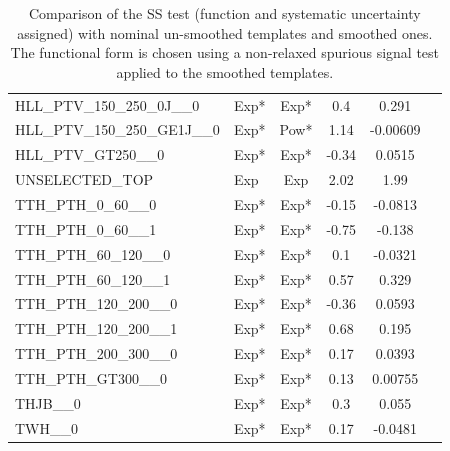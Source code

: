 \begin{table}[!h]
{\begin{tabular}{llcccc}
			HLL\_PTV\_150\_250\_0J\_\_0                                 & Exp* &Exp*&0.4&0.291\\
			HLL\_PTV\_150\_250\_GE1J\_\_0                               & Exp* &Pow*&1.14&-0.00609\\
			HLL\_PTV\_GT250\_\_0                                        & Exp* &Exp*&-0.34&0.0515\\
			UNSELECTED\_TOP                                             & Exp &Exp&2.02&1.99\\
			TTH\_PTH\_0\_60\_\_0                                        & Exp* &Exp*&-0.15&-0.0813\\
			TTH\_PTH\_0\_60\_\_1                                        & Exp* &Exp*&-0.75&-0.138\\
			TTH\_PTH\_60\_120\_\_0                                      & Exp* &Exp*&0.1&-0.0321\\
			TTH\_PTH\_60\_120\_\_1                                      & Exp* &Exp*&0.57&0.329\\
			TTH\_PTH\_120\_200\_\_0                                     & Exp* &Exp*&-0.36&0.0593\\
			TTH\_PTH\_120\_200\_\_1                                     & Exp* &Exp*&0.68&0.195\\
			TTH\_PTH\_200\_300\_\_0                                     & Exp* &Exp*&0.17&0.0393\\
			TTH\_PTH\_GT300\_\_0                                        & Exp* &Exp*&0.13&0.00755\\
			THJB\_\_0                                                   & Exp* &Exp*&0.3&0.055\\
			TWH\_\_0                                                    & Exp* &Exp*&0.17&-0.0481\\
			\hline\hline		
		\end{tabular}
	}
	\caption{
		Comparison of the SS test (function and systematic uncertainty assigned) with nominal un-smoothed templates and smoothed ones. The functional form is chosen using a non-relaxed spurious signal test applied to the smoothed templates.
		\label{tab:comp_smooth_unsmoothtight2}   }   
\end{table}
